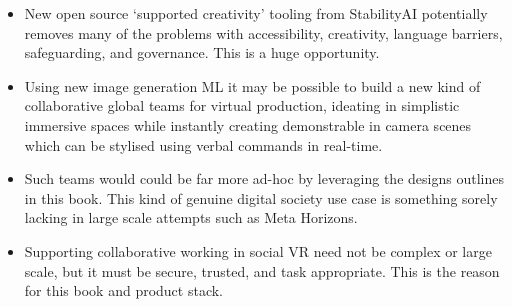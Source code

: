 \begin{itemize}
\item New open source `supported creativity' tooling from StabilityAI potentially removes many of the problems with accessibility, creativity, language barriers, safeguarding, and governance. This is a huge opportunity.
\item Using new image generation ML it may be possible to build a new kind of collaborative global teams for virtual production, ideating in simplistic immersive spaces while instantly creating demonstrable in camera scenes which can be stylised using verbal commands in real-time.
\item Such teams would could be far more ad-hoc by leveraging the designs outlines in this book. This kind of genuine digital society use case is something sorely lacking in large scale attempts such as Meta Horizons.
\item Supporting collaborative working in social VR need not be complex or large scale, but it must be secure, trusted, and task appropriate. This is the reason for this book and product stack.
\end{itemize}

